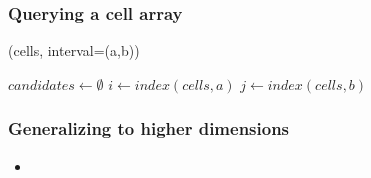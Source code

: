 \begin{frame}[fragile]
%
  \frametitle{Querying a cell array}
%
  \begin{center}
    \begin{minipage}{.85\linewidth}
      \begin{algorithm}[H]
        \label{alg:rq-cell}
%
        \dontprintsemicolon
        \setalcaphskip{0ex}
%
        \caption{\rqcell(cells, interval=(a,b))}
        \vspace{.5em}
%
        $candidates \leftarrow \emptyset$ \;
        $i \leftarrow index(cells, a)$ \;
        $j \leftarrow index(cells, b)$ \;
%
      \end{algorithm}
    \end{minipage}
  \end{center}
%
\end{frame}

\begin{frame}[fragile]
%
  \frametitle{Generalizing to higher dimensions}
%
  \begin{itemize}
%
  \item 
%
  \end{itemize}
%
\end{frame}

